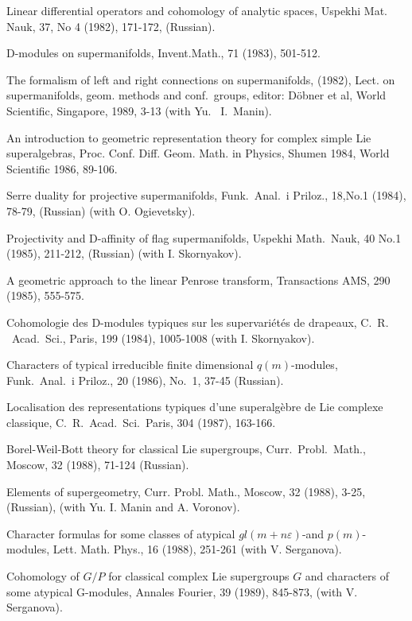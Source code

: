\myss \label{3.}  Linear differential operators and cohomology of
analytic spaces, Uspekhi Mat. Nauk, 37, No 4 (1982), 171-172,
(Russian).

\myss \label{4.} D-modules on supermanifolds, Invent.Math., 71
(1983), 501-512.

\myss \label{5.} The formalism of left and right connections on
supermanifolds, (1982), Lect. on supermanifolds, geom. methods and
conf.~groups, editor: D\"obner et al, World Scientific, Singapore,
1989, 3-13 (with Yu.~ I.~Manin).

\myss \label{6.} An introduction to geometric representation
theory for complex simple Lie superalgebras, Proc. Conf. Diff.
Geom. Math. in Physics, Shumen 1984, World Scientific 1986,
89-106.

\myss \label{7.} Serre duality for projective supermanifolds,
Funk.~Anal.~i Priloz., 18,No.1 (1984), 78-79, (Russian) (with O.
Ogievetsky).

\myss \label{8.} Projectivity and D-affinity of flag
supermanifolds, Uspekhi Math.~Nauk, 40 No.1 (1985), 211-212,
(Russian) (with I. Skornyakov).

\myss \label{9.} A geometric approach to the linear Penrose
transform, Transactions AMS, 290 (1985), 555-575.

\myss \label{10.} Cohomologie des D-modules typiques sur les
supervari\'et\'es de drapeaux, C.~R.\- ~Acad.~Sci., Paris, 199
(1984), 1005-1008 (with I. Skornyakov).

\myss \label{11.} Characters of typical irreducible finite
dimensional $q(m)$-modules, Funk.~Anal.~i Priloz., 20 (1986),
No.~1, 37-45 (Russian).

\myss \label{12.} Localisation des representations typiques d'une
superalg\`ebre de Lie complexe classique, C.~R.~Acad.~Sci.~Paris,
304 (1987), 163-166.

\myss \label{13.} Borel-Weil-Bott theory for classical Lie
supergroups, Curr.~Probl.~Math., Moscow, 32 (1988), 71-124
(Russian).

\myss \label{14.} Elements of supergeometry, Curr. Probl. Math.,
Moscow, 32 (1988), 3-25, (Russian), (with Yu. I. Manin and A.
Voronov).

\myss \label{15.} Character formulas for some classes of atypical
$gl(m+n\varepsilon)$-and $p(m)$-modules, Lett. Math. Phys., 16
(1988), 251-261 (with V. Serganova).

\myss \label{16.} Cohomology of $G/P$ for classical complex Lie
supergroups $G$ and characters of some atypical G-modules, Annales
Fourier, 39 (1989), 845-873, (with V. Serganova).

